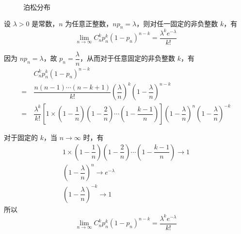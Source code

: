 \begin{figure}[htbp]
    \centering


    \caption{泊松分布}
\end{figure}

\begin{theorem}[(泊松定理)]
    设 $\lambda > 0$ 是常数，$n$ 为任意正整数，$n p_n=\lambda$，则对任一固定的非负整数 $k$，有
    $$
    \lim_{n\to\infty} C_n^k p_n^k (1-p_n)^{n-k} = \dfrac{\lambda^k e^{-\lambda}}{k!}
    $$
\end{theorem}

\begin{myproof}
    因为 $n p_n=\lambda$，故 $p_n=\dfrac{\lambda}{n}$，从而对于任意固定的非负整数 $k$，有
    $$
    \begin{aligned}
        & C_n^k p_n^k (1-p_n)^{n-k}\\
        =\ & \dfrac{n(n-1) \cdots (n-k+1)}{k!} \left( \dfrac{\lambda}{n} \right)^k \left( 1-\dfrac{\lambda}{n} \right)^{n-k}\\
        =\ & \dfrac{\lambda^k}{k!} \left[ 1 \times \left( 1-\dfrac{1}{n} \right) \left( 1-\dfrac{2}{n} \right) \cdots \left( 1-\dfrac{k-1}{n} \right) \right] \left( 1-\dfrac{\lambda}{n} \right)^n \left( 1-\dfrac{\lambda}{n} \right)^{-k}
    \end{aligned}
    $$

    对于固定的 $k$，当 $n\to\infty$ 时，有
    \begin{gather*}
        1 \times \left( 1-\dfrac{1}{n} \right) \left( 1-\dfrac{2}{n} \right) \cdots \left( 1-\dfrac{k-1}{n} \right) \to 1 \\
        \left( 1-\dfrac{\lambda}{n} \right)^n \to e^{-\lambda} \\
        \left( 1-\dfrac{\lambda}{n} \right)^{-k}\to 1
    \end{gather*}
    所以
    $$
    \lim_{n\to\infty} C_n^k p_n^k (1-p_n)^{n-k} = \dfrac{\lambda^k e^{-\lambda}}{k!}
    $$
\end{myproof}

